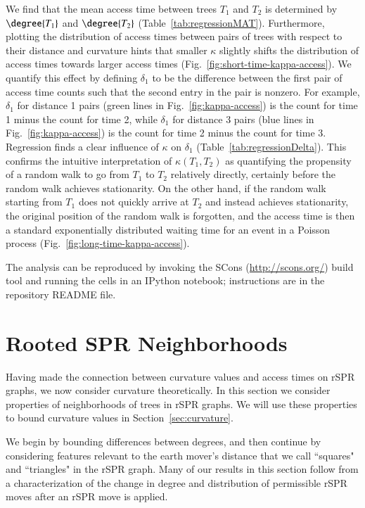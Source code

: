 \documentclass[]{elsarticle}
\begin{document}
We find that the mean access time between trees $T_1$ and $T_2$ is determined by $\degree{T_1}$ and $\degree{T_2}$ (Table~\ref{tab:regressionMAT}).
Furthermore, plotting the distribution of access times between pairs of trees with respect to their distance and curvature hints that smaller $\kappa$ slightly shifts the distribution of access times towards larger access times (Fig.~\ref{fig:short-time-kappa-access}).
We quantify this effect by defining $\delta_1$ to be the difference between the first pair of access time counts such that the second entry in the pair is nonzero.
For example, $\delta_1$ for distance 1 pairs (green lines in Fig.~\ref{fig:kappa-access}) is the count for time 1 minus the count for time 2, while $\delta_1$ for distance 3 pairs (blue lines in Fig.~\ref{fig:kappa-access}) is the count for time 2 minus the count for time 3.
Regression finds a clear influence of $\kappa$ on $\delta_1$ (Table~\ref{tab:regressionDelta}).
This confirms the intuitive interpretation of $\kappa(T_1, T_2)$ as quantifying the propensity of a random walk to go from $T_1$ to $T_2$ relatively directly, certainly before the random walk achieves stationarity.
On the other hand, if the random walk starting from $T_1$ does not quickly arrive at $T_2$ and instead achieves stationarity, the original position of the random walk is forgotten, and the access time is then a standard exponentially distributed waiting time for an event in a Poisson process (Fig.~\ref{fig:long-time-kappa-access}).



The analysis can be reproduced by invoking the SCons (\url{http://scons.org/}) build tool and running the cells in an IPython notebook; instructions are in the repository README file.


\section{Rooted SPR Neighborhoods}
\label{sec:neighborhoods}
Having made the connection between curvature values and access times on rSPR graphs, we now consider curvature theoretically.
In this section we consider properties of neighborhoods of trees in rSPR graphs.
We will use these properties to bound curvature values in Section~\ref{sec:curvature}.

We begin by bounding differences between degrees, and then continue by considering features relevant to the earth mover's distance that we call ``squares" and ``triangles" in the rSPR graph.
Many of our results in this section follow from a characterization of the change in degree and distribution of permissible rSPR moves after an rSPR move is applied.
\end{document}
